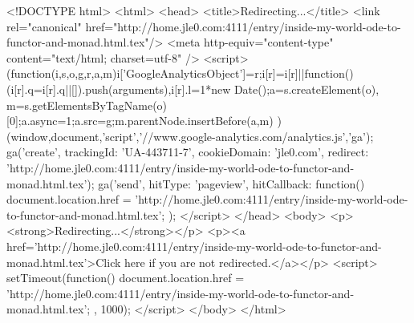 <!DOCTYPE html>
<html>
<head>
<title>Redirecting...</title>
<link rel="canonical" href="http://home.jle0.com:4111/entry/inside-my-world-ode-to-functor-and-monad.html.tex"/>
<meta http-equiv="content-type" content="text/html; charset=utf-8" />
<script>
(function(i,s,o,g,r,a,m){i['GoogleAnalyticsObject']=r;i[r]=i[r]||function(){
(i[r].q=i[r].q||[]).push(arguments)},i[r].l=1*new Date();a=s.createElement(o),
m=s.getElementsByTagName(o)[0];a.async=1;a.src=g;m.parentNode.insertBefore(a,m)
})(window,document,'script','//www.google-analytics.com/analytics.js','ga');
ga('create', { trackingId: 'UA-443711-7', cookieDomain: 'jle0.com', redirect: 'http://home.jle0.com:4111/entry/inside-my-world-ode-to-functor-and-monad.html.tex'});
ga('send', { hitType: 'pageview', hitCallback: function() { document.location.href = 'http://home.jle0.com:4111/entry/inside-my-world-ode-to-functor-and-monad.html.tex'; } });
</script>
</head>
<body>
  <p><strong>Redirecting...</strong></p>
  <p><a href='http://home.jle0.com:4111/entry/inside-my-world-ode-to-functor-and-monad.html.tex'>Click here if you are not redirected.</a></p>
  <script>
    setTimeout(function() { document.location.href = 'http://home.jle0.com:4111/entry/inside-my-world-ode-to-functor-and-monad.html.tex'; }, 1000);
  </script>
</body>
</html>
